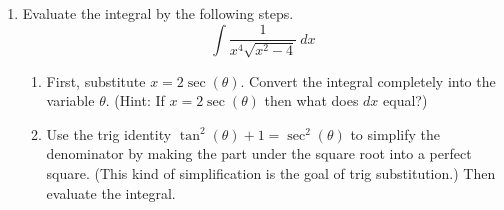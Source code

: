 \documentclass[12pt]{article}
\begin{document}
\begin{enumerate}
\begin{enumerate}
\vspace{2in}

\item $\displaystyle\int \tan^2 (x) \sec^4 (x) \ dx$

\vspace{2in}





\pagebreak

\item $\displaystyle\int {\sin (3x) \tan^2 (3x)}\ dx$

\vfill

\item $\displaystyle\int \cos^{5/2} (4-x) \sin^5 (4-x) \ dx$

\vfill

\newpage

\item $\displaystyle\int \cot^3 (x) \csc (x) \ dx$

\vfill

\item $\displaystyle\int \frac{\cos^2 (x)}{\sin^4 (x)}\ dx$

\vfill

\end{enumerate} 

\newpage


\item Evaluate the integral by the following steps.
\[\displaystyle\int  \frac{1}{x^4\sqrt{x^2-4}} \ dx\]
\begin{enumerate}
\item First, substitute $x=2\sec(\theta)$. Convert the integral completely into the variable $\theta$. (Hint: If $x=2\sec(\theta)$ then what does $dx$ equal?) 

\vspace{1.25in}
\item Use the trig identity $\tan^2(\theta)+1=\sec^2(\theta)$ to simplify the denominator by making the part under the square root into a perfect square. (This kind of simplification is the goal of trig substitution.) Then evaluate the integral.


\end{enumerate}
\end{enumerate}
\end{document}
